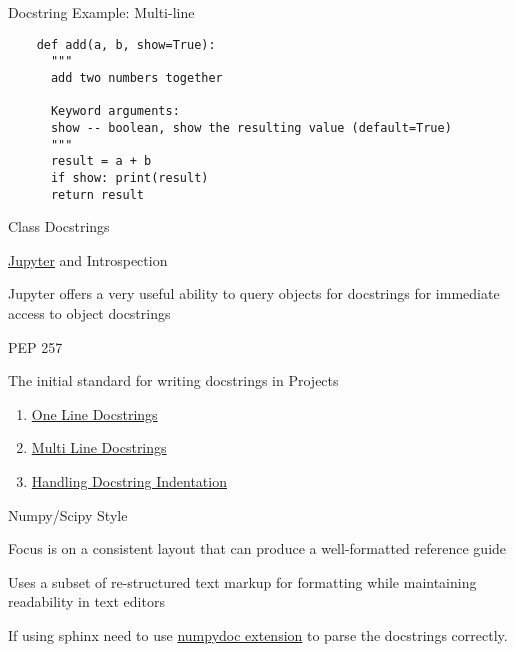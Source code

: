 \documentclass{beamer}
\begin{document}
\begin{frame}{Docstring Example: Multi-line}

    \begin{verbatim}
    def add(a, b, show=True):
      """
      add two numbers together

      Keyword arguments:
      show -- boolean, show the resulting value (default=True)
      """
      result = a + b 
      if show: print(result)
      return result
    \end{verbatim}

\end{frame}


\begin{frame}{Class Docstrings}

\end{frame}


\begin{frame}{\href{http://jupyter.org/}{Jupyter} and Introspection}

Jupyter offers a very useful ability to query objects for docstrings for immediate access to object docstrings

\end{frame}


\begin{frame}{PEP 257}

The initial standard for writing docstrings in Projects

\begin{enumerate}
\item \href{https://www.python.org/dev/peps/pep-0257/\#one-line-docstrings}{One Line Docstrings}
\item \href{https://www.python.org/dev/peps/pep-0257/\#multi-line-docstrings}{Multi Line Docstrings}
\item \href{https://www.python.org/dev/peps/pep-0257/\#handling-docstring-indentation}{Handling Docstring Indentation}
\end{enumerate}

\end{frame}

\begin{frame}{Numpy/Scipy Style}

Focus is on a consistent layout that can produce a well-formatted reference guide

Uses a subset of re-structured text markup for formatting while maintaining readability in text editors

If using sphinx need to use \href{https://github.com/numpy/numpydoc}{numpydoc extension} to parse the docstrings correctly.

\end{frame}
\end{document}
